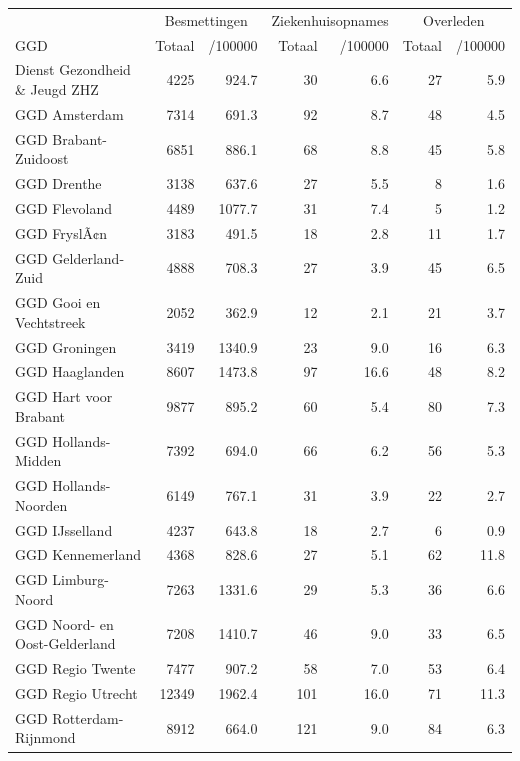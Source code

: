 \documentclass[
  english,
  man,floatsintext]{apa6}
\begin{document}
\begin{table}[H]
\centering\begingroup\fontsize{10}{12}\selectfont

\begin{threeparttable}
\begin{tabular}{lrrrrrr}
\toprule
\multicolumn{1}{c}{ } & \multicolumn{2}{c}{Besmettingen} & \multicolumn{2}{c}{Ziekenhuisopnames} & \multicolumn{2}{c}{Overleden} \\
\cmidrule(l{3pt}r{3pt}){2-3} \cmidrule(l{3pt}r{3pt}){4-5} \cmidrule(l{3pt}r{3pt}){6-7}
GGD & Totaal & /100000 & Totaal & /100000 & Totaal & /100000\\
\midrule
Dienst Gezondheid \& Jeugd ZHZ & 4225 & 924.7 & 30 & 6.6 & 27 & 5.9\\
GGD Amsterdam & 7314 & 691.3 & 92 & 8.7 & 48 & 4.5\\
GGD Brabant-Zuidoost & 6851 & 886.1 & 68 & 8.8 & 45 & 5.8\\
GGD Drenthe & 3138 & 637.6 & 27 & 5.5 & 8 & 1.6\\
GGD Flevoland & 4489 & 1077.7 & 31 & 7.4 & 5 & 1.2\\
GGD FryslÃ¢n & 3183 & 491.5 & 18 & 2.8 & 11 & 1.7\\
GGD Gelderland-Zuid & 4888 & 708.3 & 27 & 3.9 & 45 & 6.5\\
GGD Gooi en Vechtstreek & 2052 & 362.9 & 12 & 2.1 & 21 & 3.7\\
GGD Groningen & 3419 & 1340.9 & 23 & 9.0 & 16 & 6.3\\
GGD Haaglanden & 8607 & 1473.8 & 97 & 16.6 & 48 & 8.2\\
GGD Hart voor Brabant & 9877 & 895.2 & 60 & 5.4 & 80 & 7.3\\
GGD Hollands-Midden & 7392 & 694.0 & 66 & 6.2 & 56 & 5.3\\
GGD Hollands-Noorden & 6149 & 767.1 & 31 & 3.9 & 22 & 2.7\\
GGD IJsselland & 4237 & 643.8 & 18 & 2.7 & 6 & 0.9\\
GGD Kennemerland & 4368 & 828.6 & 27 & 5.1 & 62 & 11.8\\
GGD Limburg-Noord & 7263 & 1331.6 & 29 & 5.3 & 36 & 6.6\\
GGD Noord- en Oost-Gelderland & 7208 & 1410.7 & 46 & 9.0 & 33 & 6.5\\
GGD Regio Twente & 7477 & 907.2 & 58 & 7.0 & 53 & 6.4\\
GGD Regio Utrecht & 12349 & 1962.4 & 101 & 16.0 & 71 & 11.3\\
GGD Rotterdam-Rijnmond & 8912 & 664.0 & 121 & 9.0 & 84 & 6.3\\

\end{tabular}
\end{threeparttable}
\end{table}
\end{document}

